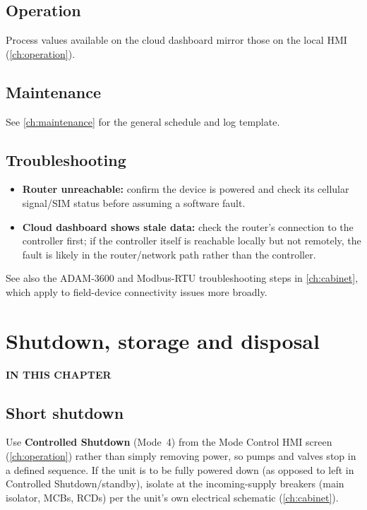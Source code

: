 \documentclass[a4paper,11pt,twoside,openright,numbers=noenddot]{scrreprt}
\newcommand{\chaptertoc}{%
  \begingroup
  \etocsetnexttocdepth{1}%
  \etocsettocstyle
    {{\sffamily\bfseries\footnotesize\color{hvmuted}IN THIS CHAPTER\par}%
     \vspace{5pt}{\color{hvink}\rule{\linewidth}{1.2pt}}\par\vspace{2pt}}{}%
  \etocsetstyle{section}{}{}
    {\par\vspace{4pt}\noindent
     \makebox[11mm][l]{\sffamily\bfseries\small\color{hvprimary}\etocnumber}%
     \sffamily\small\etocname\hfill{\color{hvmuted}\etocpage}%
     \par\vspace{4pt}{\color{hvrule}\rule{\linewidth}{0.4pt}}}{}%
  \localtableofcontents
  \endgroup}
\begin{document}
\section{Operation}
Process values available on the cloud dashboard mirror those on the local
HMI (\cref{ch:operation}).

\section{Maintenance}
See \cref{ch:maintenance} for the general schedule and log template.

\section{Troubleshooting}
\begin{itemize}
\item \textbf{Router unreachable:} confirm the device is powered and check
  its cellular signal/SIM status before assuming a software fault.
\item \textbf{Cloud dashboard shows stale data:} check the router's
  connection to the controller first; if the controller itself is
  reachable locally but not remotely, the fault is likely in the
  router/network path rather than the controller.
\end{itemize}
See also the ADAM-3600 and Modbus-RTU troubleshooting steps in
\cref{ch:cabinet}, which apply to field-device connectivity issues more
broadly.



\chapter{Shutdown, storage and disposal}
\label{ch:shutdown}
\chaptertoc

\section{Short shutdown}
Use \textbf{Controlled Shutdown} (Mode~4) from the Mode Control HMI
screen (\cref{ch:operation}) rather than simply removing power, so pumps
and valves stop in a defined sequence. If the unit is to be fully powered
down (as opposed to left in Controlled Shutdown/standby), isolate at the
incoming-supply breakers (main isolator, MCBs, RCDs) per the unit's own
electrical schematic (\cref{ch:cabinet}).
\end{document}
